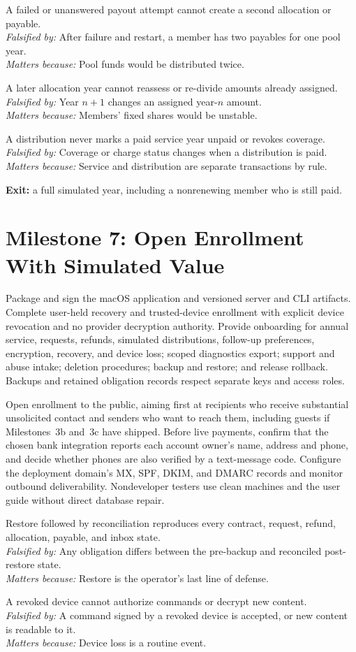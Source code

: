 \documentclass[11pt]{article}
\newenvironment{claims}{\begin{description}[leftmargin=1em,style=nextline,itemsep=0.4em]}{\end{description}}
\newcommand{\claim}[4]{\Needspace{6\baselineskip}\item[Claim (#1).] #2\\
    \textit{Falsified by:} #3\\
    \textit{Matters because:} #4}
\begin{document}
\begin{claims}
\claim{PostgreSQL}{A failed or unanswered payout attempt cannot create a second allocation or payable.}
    {After failure and restart, a member has two payables for one pool year.}
    {Pool funds would be distributed twice.}
\claim{PostgreSQL}{A later allocation year cannot reassess or re-divide amounts already assigned.}
    {Year $n+1$ changes an assigned year-$n$ amount.}
    {Members' fixed shares would be unstable.}
\claim{integration}{A distribution never marks a paid service year unpaid or revokes coverage.}
    {Coverage or charge status changes when a distribution is paid.}
    {Service and distribution are separate transactions by rule.}
\end{claims}

\textbf{Exit:} a full simulated year, including a nonrenewing member who is still
paid.

\section{Milestone 7: Open Enrollment With Simulated Value}

Package and sign the macOS application and versioned server and CLI artifacts.
Complete user-held recovery and trusted-device enrollment with explicit device
revocation and no provider decryption authority. Provide onboarding for annual
service, requests, refunds, simulated distributions, follow-up preferences,
encryption, recovery, and device loss; scoped diagnostics export; support and
abuse intake; deletion procedures; backup and restore; and release rollback.
Backups and retained obligation records respect separate keys and access roles.

Open enrollment to the public, aiming first at recipients who receive substantial
unsolicited contact and senders who want to reach them, including guests if
Milestones~3b and~3c have shipped. Before live payments, confirm that the chosen
bank integration reports each account owner's name, address and phone, and decide
whether phones are also verified by a text-message code.
Configure the deployment domain's MX, SPF, DKIM, and DMARC records and monitor
outbound deliverability. Nondeveloper
testers use clean machines and the user guide without direct database repair.

\begin{claims}
\claim{integration}{Restore followed by reconciliation reproduces every contract, request, refund, allocation, payable, and inbox state.}
    {Any obligation differs between the pre-backup and reconciled post-restore state.}
    {Restore is the operator's last line of defense.}
\claim{integration}{A revoked device cannot authorize commands or decrypt new content.}
    {A command signed by a revoked device is accepted, or new content is readable to it.}
    {Device loss is a routine event.}
\end{claims}
\end{document}
